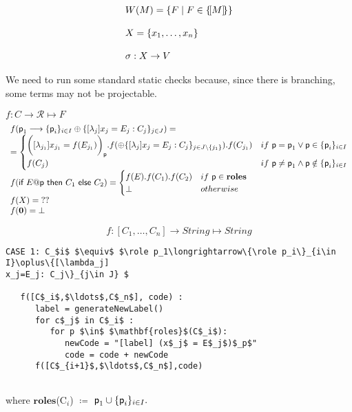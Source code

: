 \begin{displaymath}
  \begin{array}{lll}
    W(M) = \{F \mid F\in\{\![M]\!\}\}
    \\\\
    X = \{x_1,\ldots,x_n\}
    \\\\
    \sigma : X \rightarrow V
  \end{array}
\end{displaymath}



 We need to run some standard
static checks because, since there is branching, some terms may not be
projectable.


$f: C\rightarrow \mathcal R\mapsto F$
\[
\begin{array}{l}
f(\textsf{p}_1\longrightarrow\{\textsf{p}_i\}_{i\in I}\oplus\{[\lambda_j]
x_j=E_j: C_j\}_{j\in J}) = \\
= \begin{cases}
\bigg( [\lambda_{j_1}] x_{j_1} = f(E_{j_1}) \bigg)_{\textsf{p}}. f(\oplus\{[\lambda_j]
x_j=E_j: C_j\}_{j\in J\setminus\{{j_1}\}}). f(C_{j_1}) &if \ \textsf{p} = \textsf{p}_1 \lor \textsf{p} \in \textsf{\{}\textsf{p}_i\}_{i \in I} \\
f(C_j) & if \ \textsf{p} \neq \textsf{p}_1 \land \textsf{p} \notin \{\textsf{p}_i\}_{i\in I}
\end{cases} 
\\
f(\textsf{if } E@\textsf{p} \textsf{ then } C_1 \textsf{ else } C_2) = \begin{cases}
f(E) . f(C_1) . f(C_2) & if\ \textsf{p}\in \mathbf{roles}\\
\bot & otherwise
\end{cases} 
\\
f(X) = \; ??
\\
f(\mathbf{0}) = \bot
\end{array}
\]


\[
f: [C_1,\ldots,C_n] \rightarrow String \mapsto String
\]


\begin{lstlisting}[mathescape=true,backgroundcolor={}]
CASE 1: C_$i$ $\equiv$ $\role p_1\longrightarrow\{\role p_i\}_{i\in I}\oplus\{[\lambda_j]
x_j=E_j: C_j\}_{j\in J} $

   f([C$_i$,$\ldots$,C$_n$], code) :
      label = generateNewLabel()
      for c$_j$ in C$_i$ :
         for p $\in$ $\mathbf{roles}$(C$_i$):
            newCode = "[label] (x$_j$ = E$_j$)$_p$"
            code = code + newCode
      f([C$_{i+1}$,$\ldots$,C$_n$],code)
      
\end{lstlisting}    
where $\mathbf{roles}$(C$_i$) $\coloneqq$ $\textsf{p}_1  \cup \{\textsf{p}_i\}_{i\in I}.$




